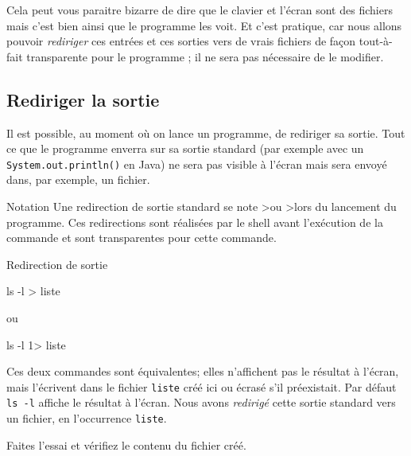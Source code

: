 \documentclass[a4paper,11pt]{article}
\begin{document}
	Cela peut vous paraitre bizarre de dire que le clavier et l'\'ecran sont des fichiers
	mais c'est bien ainsi que le programme les voit. Et c'est pratique, car nous allons pouvoir
	\textit{rediriger} ces entr\'ees et ces sorties vers de vrais fichiers de fa\c con tout-\`a-fait transparente pour le
	programme ; il ne sera pas n\'ecessaire de le modifier.
				


	\subsection{Rediriger la sortie}
		Il est possible, au moment o\`u on lance un programme, de rediriger sa sortie.
		Tout ce que le programme enverra sur sa sortie standard
		(par exemple avec un \verb_System.out.println()_ en Java) ne sera pas visible \`a l'\'ecran
		mais sera envoy\'e dans, par exemple, un fichier.
		\par		
		\begin{coltbox}{Notation}
			Une redirection de sortie standard se note \guillemotleft >\guillemotright  ou >\guillemotright  lors du lancement du programme.
			Ces redirections sont r\'ealis\'ees par le shell avant l'ex\'ecution de la commande et sont transparentes pour cette commande.
		\end{coltbox}
					
		\begin{Exemple}{Redirection de sortie}
		        \begin{Console}
				ls -l > liste
		 	\end{Console}
			ou
			 \begin{Console}
				ls -l 1> liste
		 	\end{Console}
		\end{Exemple}
		
		Ces deux commandes sont \'equivalentes; elles n'affichent pas le r\'esultat \`a l'\'ecran,
		mais l'\'ecrivent dans le fichier \verb_liste_ cr\'e\'e ici ou \'ecras\'e s'il pr\'eexistait.
		Par d\'efaut \verb_ls -l_  affiche le r\'esultat \`a l'\'ecran. Nous avons \textit{redirig\'e} 
		cette sortie standard vers un fichier, en l'occurrence \verb_liste_.
				
            \par
        		\begin{steps}
			\item Faites l'essai et v\'erifiez le contenu du fichier cr\'e\'e.
		\end{steps}
				
\end{document}
